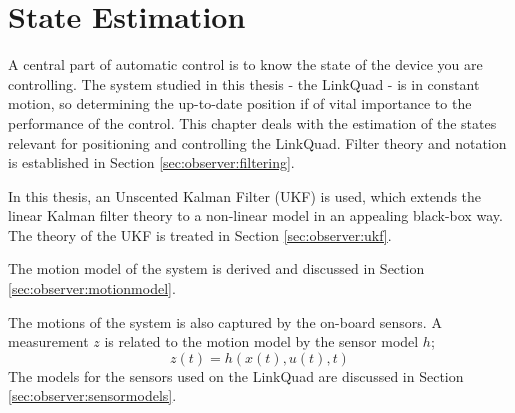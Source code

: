 \chapter{State Estimation}
\label{cha:observer}
    A central part of automatic control is to know the state of the device you are
    controlling. The system studied in this thesis - the LinkQuad - is in constant
    motion, so determining the up-to-date position if of vital importance to the performance
    of the control.
    This chapter deals with the estimation of the states relevant for positioning
    and controlling the LinkQuad.
    Filter theory and notation is established in Section \ref{sec:observer:filtering}.

    In this thesis, an Unscented Kalman Filter (UKF) is used, which extends the
    linear Kalman filter theory to a non-linear model in an appealing black-box way.
    The theory of the UKF is treated in Section \ref{sec:observer:ukf}.

    The motion model of the system is derived and discussed in Section \ref{sec:observer:motionmodel}.

    The motions of the system is also captured by the on-board sensors.
    A measurement $z$ is related to the motion model by the sensor model $h$;
    \begin{equation}
        z(t) = h(x(t),u(t),t)
    \end{equation}
    The models for the sensors used on the LinkQuad are discussed in
    Section \ref{sec:observer:sensormodels}.

    
    
